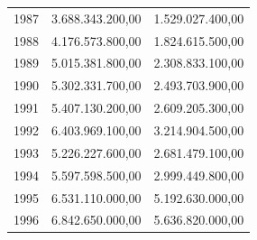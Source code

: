 \documentclass[a4paper,openright,12pt]{book}
\begin{document}
\begin{table}[]
\begin{tabular}{@{}lll@{}}
1987 & 3.688.343.200,00                                                                                                      & 1.529.027.400,00                                                                                                      \\
1988 & 4.176.573.800,00                                                                                                      & 1.824.615.500,00                                                                                                      \\
1989 & 5.015.381.800,00                                                                                                      & 2.308.833.100,00                                                                                                      \\
1990 & 5.302.331.700,00                                                                                                      & 2.493.703.900,00                                                                                                      \\
1991 & 5.407.130.200,00                                                                                                      & 2.609.205.300,00                                                                                                      \\
1992 & 6.403.969.100,00                                                                                                      & 3.214.904.500,00                                                                                                      \\
1993 & 5.226.227.600,00                                                                                                      & 2.681.479.100,00                                                                                                      \\
1994 & 5.597.598.500,00                                                                                                      & 2.999.449.800,00                                                                                                      \\
1995 & 6.531.110.000,00                                                                                                      & 5.192.630.000,00                                                                                                      \\
1996 & 6.842.650.000,00                                                                                                      & 5.636.820.000,00                                                                                                      \\

\end{tabular}
\end{table}
\end{document}

